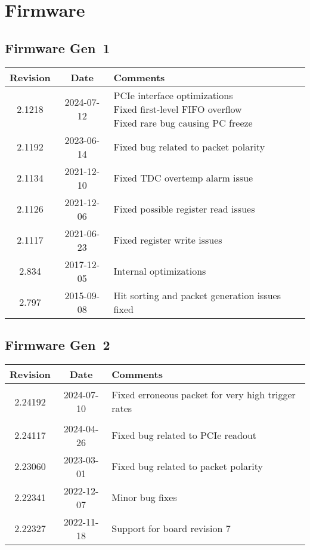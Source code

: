 \section{Firmware}
\subsection{Firmware Gen~1}
\begin{tabularx}{\textwidth}{|c|c|X|}
    \hline
    Revision & Date & Comments\\
    \hline\hline
    2.1218 & 2024-07-12 & \makecell[l]{
        PCIe interface optimizations\\*
        Fixed first-level FIFO overflow\\*
        Fixed rare bug causing PC freeze\\*
    }\\
    \hline
    2.1192 & 2023-06-14 & Fixed bug related to packet polarity\\
    \hline
    2.1134 & 2021-12-10 & Fixed TDC overtemp alarm issue\\
    \hline
    2.1126 & 2021-12-06 & Fixed possible register read issues\\
    \hline
    2.1117 & 2021-06-23 & Fixed register write issues\\
    \hline
    2.834 & 2017-12-05 & Internal optimizations\\
    \hline
    2.797 & 2015-09-08 & Hit sorting and packet generation issues fixed\\
    \hline
\end{tabularx}


\subsection{Firmware Gen~2}
\begin{tabularx}{\textwidth}{|c|c|X|}
    \hline
    Revision & Date & Comments\\
    \hline\hline
    \hypertarget{fwrev}{2.24192} & 2024-07-10 & Fixed erroneous packet for very high trigger rates\\
    \hline
    {2.24117} & 2024-04-26 & Fixed bug related to PCIe readout\\
    \hline
    {2.23060} & 2023-03-01 & Fixed bug related to packet polarity\\
    \hline
    {2.22341} & 2022-12-07 & Minor bug fixes\\
    \hline
    {2.22327} & 2022-11-18 & Support for board revision 7\\
    \hline
\end{tabularx}
